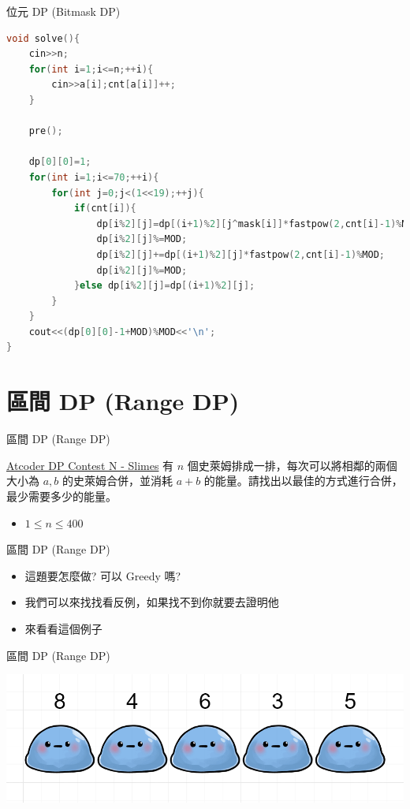 \documentclass[aspectratio=169]{beamer}
\begin{document}
    \begin{frame}[fragile]{位元 DP (Bitmask DP)}
        \begin{lstlisting}[language=C++, basicstyle=\ttfamily\tiny]
void solve(){
    cin>>n;
    for(int i=1;i<=n;++i){
        cin>>a[i];cnt[a[i]]++;
    }
    
    pre();
    
    dp[0][0]=1;
    for(int i=1;i<=70;++i){
        for(int j=0;j<(1<<19);++j){
            if(cnt[i]){
                dp[i%2][j]=dp[(i+1)%2][j^mask[i]]*fastpow(2,cnt[i]-1)%MOD;
                dp[i%2][j]%=MOD;
                dp[i%2][j]+=dp[(i+1)%2][j]*fastpow(2,cnt[i]-1)%MOD;
                dp[i%2][j]%=MOD;
            }else dp[i%2][j]=dp[(i+1)%2][j];
        }
    }
    cout<<(dp[0][0]-1+MOD)%MOD<<'\n';
}
        \end{lstlisting}
    \end{frame}

    \section{區間 DP (Range DP)}
    
    \begin{frame}{區間 DP (Range DP)}
        \begin{block}{\href{https://atcoder.jp/contests/dp/tasks/dp_n}{Atcoder DP Contest N - Slimes}}
            有 $n$ 個史萊姆排成一排，每次可以將相鄰的兩個大小為 $a,b$ 的史萊姆合併，並消耗 $a+b$ 的能量。請找出以最佳的方式進行合併，最少需要多少的能量。
            \begin{itemize}
                \item $1 \le n \le 400$
            \end{itemize}
        \end{block}
    \end{frame}
    
    \begin{frame}{區間 DP (Range DP)}
        \begin{itemize}
            \item 這題要怎麼做? 可以 Greedy 嗎?
            \item<2-> 我們可以來找找看反例，如果找不到你就要去證明他
            \item<3-> 來看看這個例子
        \end{itemize}
    \end{frame}
    
    \begin{frame}{區間 DP (Range DP)}
        \begin{center}
            \includegraphics[width=\textwidth]{images/slimes.png}
        \end{center}
    \end{frame}
    
\end{document}
